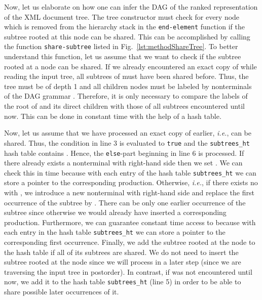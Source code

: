 \documentclass[12pt]{llncs}
\newcommand{\hairsp}{\hspace{1pt}}\newcommand{\TODO}{\textcolor{red}{\bf TODO!}\xspace}
\newcommand{\ie}{\mbox{\textit{i.\hairsp{}e.}}\xspace}
\begin{document}
Now, let us elaborate on how one can infer the DAG of the ranked representation  of the XML document tree. The tree constructor must check for every node which is removed from the hierarchy stack in the \verb|end-element| function if the subtree rooted at this node can be shared. This can be accomplished by calling the function \verb|share-subtree| listed in 
Fig.~\ref{lst:methodShareTree}. To better understand this function, let us assume that we want to check if the subtree  rooted at a node  can be shared. If we already encountered an exact copy of  while reading the input tree, all subtrees of  must have been shared before. Thus, the tree  must be of depth 1 and all children nodes must be labeled by nonterminals of the DAG grammar . Therefore, it is only necessary to compare the labels of the root of  and its direct children with those of all subtrees encountered until now. This can be done in constant time with the help of a hash table.

Now, let us assume that we have processed an exact copy of  earlier, \ie,  can be shared. Thus, the condition in line 3 is evaluated to \verb|true| and the \verb|subtrees_ht| hash table contains . Hence, the \verb|else|-part beginning in line 6 is processed. If there already exists a nonterminal  with right-hand side  then we set . We can check this in  time because with each entry of the hash table \verb|subtrees_ht| we can store a pointer to the corresponding production. Otherwise, \ie, if there exists no  with , we introduce a new nonterminal  with right-hand side  and replace the first occurrence  of the subtree  by . There can be only one earlier occurrence of the subtree  since otherwise we would already have inserted a corresponding production. Furthermore, we can guarantee constant time access to  because with each entry in the hash table \verb|subtrees_ht| we can store a pointer to the corresponding first occurrence. Finally, we add the subtree rooted at the node  to the hash table if all of its subtrees are shared. We do not need to insert the subtree rooted at the node  since we will process  in a later step (since we are traversing the input tree in postorder). In contrast, if  was not encountered until now, we add it to the hash table \verb|subtrees_ht| (line 5) in order to be able to share possible later occurrences of it.
\end{document}
